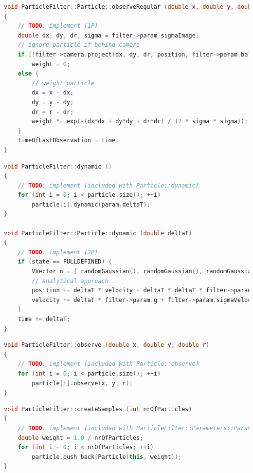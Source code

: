 \documentclass{ezb}
\begin{document}
\begin{lstlisting}[language=C++, caption=Integrate an observation of the ball once the particle is fully initialized]
void ParticleFilter::Particle::observeRegular (double x, double y, double r)
{
	// TODO: implement (1P)
	double dx, dy, dr, sigma = filter->param.sigmaImage;
	// ignore particle if behind camera
	if (!filter->camera.project(dx, dy, dr, position, filter->param.ballRadius)) 
		weight = 0;
	else {
		// weight particle
		dx = x - dx;
		dy = y - dy;
		dr = r - dr;
		weight *= exp(-(dx*dx + dy*dy + dr*dr) / (2 * sigma * sigma));
	}
	timeOfLastObservation = time;
}
\end{lstlisting}

\begin{lstlisting}[language=C++, caption= Time \textbackslash c deltaT has passed. Proceed to the next image and update the particles accordingly.]
void ParticleFilter::dynamic ()
{
	// TODO: implement (included with Particle::dynamic)
	for (int i = 0; i < particle.size(); ++i)
		particle[i].dynamic(param.deltaT);
}

void ParticleFilter::Particle::dynamic (double deltaT)
{
	// TODO: implement (2P)
	if (state == FULLDEFINED) {
		VVector n = { randomGaussian(), randomGaussian(), randomGaussian(), 0};
		// analytical approach
		position += deltaT * velocity + deltaT * deltaT * filter->param.g * .5;
		velocity += deltaT * filter->param.g + filter->param.sigmaVelocity * sqrt(deltaT) * n;
	}
	time += deltaT;
}
\end{lstlisting}

\begin{lstlisting}[language=C++, caption= A ball has been seen with image \textbackslash c x y and radius \textbackslash c r.]
void ParticleFilter::observe (double x, double y, double r)
{
	// TODO: implement (included with Particle::observe)
	for (int i = 0; i < particle.size(); ++i)
		particle[i].observe(x, y, r);
}
\end{lstlisting}

\begin{lstlisting}[language=C++, caption=Initialize the particle filter with \textbackslash c nrOfParticles particles]
void ParticleFilter::createSamples (int nrOfParticles)
{
	// TODO: implement (included with ParticleFilter::Parameters::Parameters)
	double weight = 1.0 / nrOfParticles;
	for (int i = 0; i < nrOfParticles; ++i)
		particle.push_back(Particle(this, weight));
}
\end{lstlisting}
\end{document}
